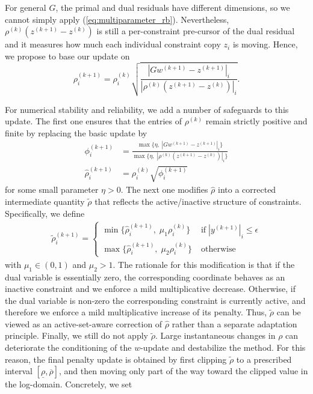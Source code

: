\documentclass[letterpaper, 10 pt, conference]{ieeeconf}  %
\begin{document}
For general $G$, the primal and dual residuals have different dimensions, so we cannot simply apply (\ref{eq:multiparameter_rb}). Nevertheless, $ \rho^{(k)}(z^{(k+1)}-z^{(k)})$ is still a per-constraint pre-cursor of the dual residual and it measures how much each individual constraint copy $z_i$ is moving. Hence, we propose to base our update on
\begin{equation}
\label{eq:update_rule_naive}
\rho_i^{(k+1)} = \rho_i^{(k)} \sqrt{\frac{|G w^{(k+1)} - z^{(k+1)}|_i}{|\rho^{(k)}\left(z^{(k+1)} - z^{(k)}\right)|_i}}.
\end{equation}

For numerical stability and reliability, we add a number of safeguards to this update. The first one ensures that the entries of $\rho^{(k)}$ remain strictly positive and finite by replacing the basic update by 
\begin{equation}
\begin{aligned}
\phi_i^{(k+1)} &= \frac{\max\{ \eta, \; |Gw^{(k+1)} - z^{(k+1)}|_i \}}{\max\{ \eta, \; |\rho^{(k)} (z^{(k+1)} - z^{(k)})|_i \}}    \\
\hat{\rho}_i^{(k+1)} &= \rho^{(k)}_i \sqrt{\phi_i^{(k+1)}} 
\end{aligned}
\end{equation}
for some small parameter $\eta>0$. The next one modifies $\hat{\rho}$ into a corrected intermediate quantity $\tilde{\rho}$
that reflects the active/inactive structure of constraints. Specifically, we define
\begin{equation}
\label{eq:rho_tilde}
\begin{aligned}
    \tilde{\rho}_i^{(k+1)} = \begin{cases}
        \min\{\hat{\rho}_i^{(k+1)}, \; \mu_1 \rho_i^{(k)}\} \; &\text{if}\; |y^{(k+1)}|_i \leq \epsilon \\
        \max\{\hat{\rho}_i^{(k+1)}, \; \mu_2 \rho_i^{(k)}\} \; &\text{otherwise}
    \end{cases}
\end{aligned}
\end{equation}
with $\mu_1 \in (0,1)$ and $\mu_2 > 1$. The rationale for this modification is that if the dual variable is essentially zero, the corresponding coordinate behaves as an inactive constraint and we enforce a mild multiplicative decrease. Otherwise, if the dual variable is non-zero the corresponding constraint is currently active, and therefore we enforce a mild multiplicative increase of its penalty. 
Thus, $\tilde{\rho}$ can be viewed as an active-set-aware correction of $\hat{\rho}$ rather than a separate adaptation principle. Finally, we still do not apply $\tilde{\rho}$. Large instantaneous changes in $\rho$ can deteriorate the conditioning of the $w$-update and destabilize the method. For this reason, the final penalty update is obtained by first clipping $\tilde{\rho}$ to a prescribed interval $[\underline{\rho}, \overline{\rho}]$, and then moving only part of the way toward the clipped value in the log-domain. Concretely, we set
\end{document}
